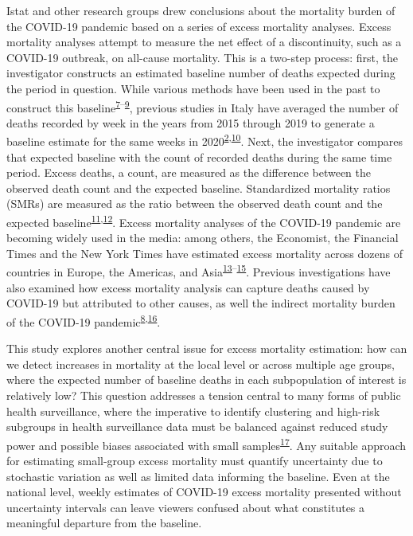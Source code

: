 \documentclass[
]{article}
\begin{document}
Istat and other research groups drew conclusions about the mortality burden of the COVID-19 pandemic based on a series of excess mortality analyses. Excess mortality analyses attempt to measure the net effect of a discontinuity, such as a COVID-19 outbreak, on all-cause mortality. This is a two-step process: first, the investigator constructs an estimated baseline number of deaths expected during the period in question. While various methods have been used in the past to construct this baseline\textsuperscript{\protect\hyperlink{ref-Serfling1963}{7}--\protect\hyperlink{ref-Noufaily2013}{9}}⁠, previous studies in Italy have averaged the number of deaths recorded by week in the years from 2015 through 2019 to generate a baseline estimate for the same weeks in 2020\textsuperscript{\protect\hyperlink{ref-Alicandro2020}{2},\protect\hyperlink{ref-Michelozzi2020}{10}}⁠. Next, the investigator compares that expected baseline with the count of recorded deaths during the same time period. Excess deaths, a count, are measured as the difference between the observed death count and the expected baseline. Standardized mortality ratios (SMRs) are measured as the ratio between the observed death count and the expected baseline\textsuperscript{\protect\hyperlink{ref-Dickman2004}{11},\protect\hyperlink{ref-Lambert2005}{12}}⁠. Excess mortality analyses of the COVID-19 pandemic are becoming widely used in the media: among others, the Economist, the Financial Times and the New York Times have estimated excess mortality across dozens of countries in Europe, the Americas, and Asia\textsuperscript{\protect\hyperlink{ref-Wu2020}{13}--\protect\hyperlink{ref-FTVisualux5cux26DataJournalismteam2020}{15}}⁠. Previous investigations have also examined how excess mortality analysis can capture deaths caused by COVID-19 but attributed to other causes, as well the indirect mortality burden of the COVID-19 pandemic\textsuperscript{\protect\hyperlink{ref-Weinberger2020a}{8},\protect\hyperlink{ref-U.S.NationalCenterforHealthStatistics2021}{16}}.

This study explores another central issue for excess mortality estimation: how can we detect increases in mortality at the local level or across multiple age groups, where the expected number of baseline deaths in each subpopulation of interest is relatively low? This question addresses a tension central to many forms of public health surveillance, where the imperative to identify clustering and high-risk subgroups in health surveillance data must be balanced against reduced study power and possible biases associated with small samples\textsuperscript{\protect\hyperlink{ref-Thacker1988}{17}}⁠. Any suitable approach for estimating small-group excess mortality must quantify uncertainty due to stochastic variation as well as limited data informing the baseline. Even at the national level, weekly estimates of COVID-19 excess mortality presented without uncertainty intervals can leave viewers confused about what constitutes a meaningful departure from the baseline.
\end{document}
